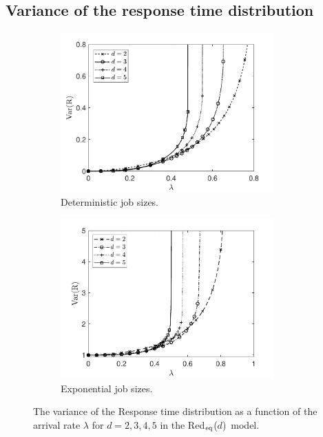 \documentclass[12pt]{report}
\newcommand{\Redid}{Red$_{\textup{eq}}$($d$)}
\begin{document}
\subsection{Variance of the response time distribution}
\begin{figure}[t]
\begin{subfigure}{.45\textwidth}
\begin{center}
\includegraphics[width=0.9\textwidth]{figures/Chapter3/plotVarRTDet.pdf}
\caption{Deterministic job sizes.}
\label{fig:var_det}
\end{center}
\end{subfigure}
\begin{subfigure}{.45\textwidth}
\begin{center}
\includegraphics[width=0.9\textwidth]{figures/Chapter3/plotVarRTExp.pdf}
\caption{Exponential job sizes.}
\label{fig:var_discr}
\end{center}
\end{subfigure}
\caption{The variance of the Response time distribution as a function of the arrival rate $\lambda$ for $d=2,3,4,5$ in the \Redid\ model.}
\label{fig:var_id}
\end{figure}
\end{document}
